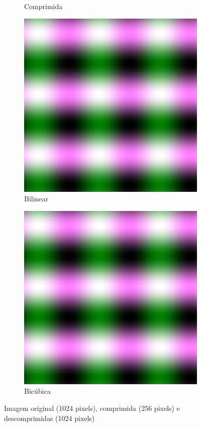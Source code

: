\documentclass{article}
\begin{document}
\begin{figure}[ht]
\begin{subfigure}{0.23\textwidth}
    \caption{Comprimida}
  \end{subfigure}%
  \hfill
  \begin{subfigure}{0.23\textwidth}
    \centering
    \includegraphics[width=\textwidth]{senoidal/h-1/decompressed-bilinear.png}
    \caption{Bilinear}
  \end{subfigure}%
  \hfill
  \begin{subfigure}{0.23\textwidth}
    \centering
    \includegraphics[width=\textwidth]{senoidal/h-1/decompressed-bicubica.png}
    \caption{Bicúbica}
  \end{subfigure}
  \caption{Imagem original (1024 pixels), comprimida (256 pixels) e descomprimidas (1024 pixels)}
\end{figure}
\end{document}
